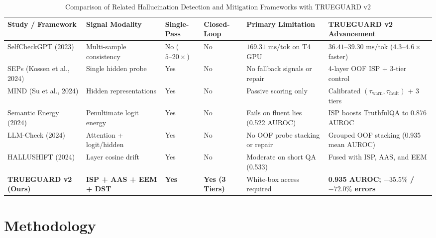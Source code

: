 \documentclass[journal]{IEEEtran}
\begin{document}
\begin{table}[t]
\centering
\caption{Comparison of Related Hallucination Detection and Mitigation Frameworks with TRUEGUARD v2}
\begin{tabular}{llllll}
\toprule
Study / Framework & Signal Modality & Single-Pass & Closed-Loop & Primary Limitation & TRUEGUARD v2 Advancement \\
\midrule
SelfCheckGPT (2023) & Multi-sample consistency & No ($5\text{--}20\times$) & No & $169.31\text{ ms/tok}$ on T4 GPU & $36.41\text{--}39.30\text{ ms/tok}$ ($4.3\text{--}4.6\times$ faster) \\
SEPs (Kossen et al., 2024) & Single hidden probe & Yes & No & No fallback signals or repair & 4-layer OOF ISP + 3-tier control \\
MIND (Su et al., 2024) & Hidden representations & Yes & No & Passive scoring only & Calibrated $(\tau_{\text{warn}},\tau_{\text{fault}})$ + 3 tiers \\
Semantic Energy (2024) & Penultimate logit energy & Yes & No & Fails on fluent lies (0.522 AUROC) & ISP boosts TruthfulQA to 0.876 AUROC \\
LLM-Check (2024) & Attention + logit/hidden & Yes & No & No OOF probe stacking or repair & Grouped OOF stacking (0.935 mean AUROC) \\
HALLUSHIFT (2024) & Layer cosine drift & Yes & No & Moderate on short QA (0.533) & Fused with ISP, AAS, and EEM \\
\textbf{TRUEGUARD v2 (Ours)} & \textbf{ISP + AAS + EEM + DST} & \textbf{Yes} & \textbf{Yes (3 Tiers)} & White-box access required & \textbf{0.935 AUROC; $-35.5\%$ / $-72.0\%$ errors} \\
\bottomrule
\end{tabular}
\end{table}

\section{Methodology}
\end{document}
